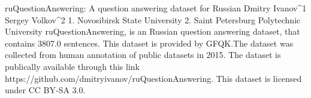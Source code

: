
ruQuestionAnswering: A question answering dataset for Russian
Dmitry Ivanov^1 Sergey Volkov^2
1. Novosibirsk State University 2. Saint Petersburg Polytechnic University
ruQuestionAnswering, is an Russian question answering dataset, that contains 3807.0 sentences.
This dataset is provided by GFQK.The dataset was collected from human annotation of public datasets in 2015. 
The dataset is publically available through this link https://github.com/dmitryivanov/ruQuestionAnswering. This dataset is licensed under CC BY-SA 3.0.

